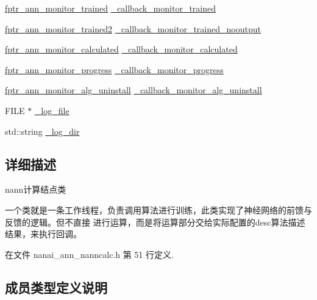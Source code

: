 \begin{DoxyCompactItemize}
\item 
\hyperlink{namespacenanai_adb209ab120b98e800db2b0c8621cd488}{fptr\+\_\+ann\+\_\+monitor\+\_\+trained} \hyperlink{classnanai_1_1nanai__ann__nanncalc_abe6bd5a48bafb89a185a8e359ffdcff3}{\+\_\+callback\+\_\+monitor\+\_\+trained}
\item 
\hyperlink{namespacenanai_a598e872bf861dac8080e98d6d155b3b5}{fptr\+\_\+ann\+\_\+monitor\+\_\+trained2} \hyperlink{classnanai_1_1nanai__ann__nanncalc_a0395dff2948785f646f22be1df04bad1}{\+\_\+callback\+\_\+monitor\+\_\+trained\+\_\+nooutput}
\item 
\hyperlink{namespacenanai_afc00080af95a1dc2349880f03d7d6a88}{fptr\+\_\+ann\+\_\+monitor\+\_\+calculated} \hyperlink{classnanai_1_1nanai__ann__nanncalc_af9ee346f2307a03b8570ec21839a3e88}{\+\_\+callback\+\_\+monitor\+\_\+calculated}
\item 
\hyperlink{namespacenanai_a5c9964edbd4db8ae35df7cd024020e87}{fptr\+\_\+ann\+\_\+monitor\+\_\+progress} \hyperlink{classnanai_1_1nanai__ann__nanncalc_af937dc713e3780b86b5ebf2311360dd7}{\+\_\+callback\+\_\+monitor\+\_\+progress}
\item 
\hyperlink{namespacenanai_a04b231ce428a771ab1a9aace53be65c6}{fptr\+\_\+ann\+\_\+monitor\+\_\+alg\+\_\+uninstall} \hyperlink{classnanai_1_1nanai__ann__nanncalc_a524fbed26f582cdf403407173da1634b}{\+\_\+callback\+\_\+monitor\+\_\+alg\+\_\+uninstall}
\item 
F\+I\+L\+E $\ast$ \hyperlink{classnanai_1_1nanai__ann__nanncalc_ad7f1e9a64ffdf10347e0f7175a73103c}{\+\_\+log\+\_\+file}
\item 
std\+::string \hyperlink{classnanai_1_1nanai__ann__nanncalc_ad02491864e160b837d6b84f635f5947a}{\+\_\+log\+\_\+dir}
\end{DoxyCompactItemize}


\subsection{详细描述}
nann计算结点类

一个类就是一条工作线程，负责调用算法进行训练，此类实现了神经网络的前馈与反馈的逻辑。但不直接 进行运算，而是将运算部分交给实际配置的desc算法描述结果，来执行回调。 

在文件 nanai\+\_\+ann\+\_\+nanncalc.\+h 第 51 行定义.



\subsection{成员类型定义说明}
\hypertarget{classnanai_1_1nanai__ann__nanncalc_a44c56088d31cafacdb5324d36a88fd51}{}
